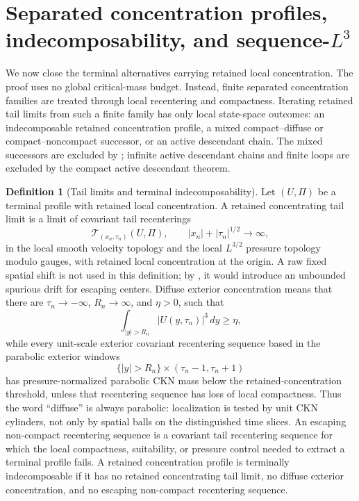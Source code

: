 \documentclass[11pt]{amsart}
\numberwithin{equation}{section}
\theoremstyle{plain}
\theoremstyle{definition}
\newtheorem{definition}[theorem]{Definition}
\theoremstyle{remark}
\begin{document}
\section{Separated concentration profiles, indecomposability, and sequence-\texorpdfstring{\(L^3\)}{L3}}
\label{sec:separated-profiles-atomic}

We now close the terminal alternatives carrying retained local concentration.
The proof uses no global critical-mass budget.  Instead, finite separated
concentration families are treated
through local recentering and compactness.  Iterating retained tail limits from
such a finite family has only local state-space outcomes: an indecomposable
retained concentration profile, a mixed compact--diffuse or compact--noncompact
successor, or an active descendant chain.  The mixed successors are excluded
by ; infinite active descendant chains and finite
loops are excluded by the compact active descendant theorem.

\begin{definition}[Tail limits and terminal indecomposability]
\label{def:atomic-terminal-profile}
Let \((U,\Pi)\) be a terminal profile with retained local concentration.  A
retained concentrating tail limit is a limit of covariant tail recenterings
\[
   \mathscr T_{(x_n,\tau_n)}(U,\Pi),
   \qquad |x_n|+|\tau_n|^{1/2}\to\infty,
\]
   in the local smooth velocity topology and the local \(L^{3/2}\) pressure
   topology modulo gauges, with retained local concentration at the origin.  A raw
   fixed spatial shift is not used in this definition; by
   , it would introduce an
   unbounded spurious drift for escaping centers.  Diffuse exterior concentration
   means that there are \(\tau_n\to-\infty\), \(R_n\to\infty\), and \(\eta>0\),
   such that
  \[
     \int_{|y|>R_n}|U(y,\tau_n)|^3\,dy\ge\eta,
  \]
   while every unit-scale exterior covariant recentering sequence based in the
   parabolic exterior windows
   \[
      \{|y|>R_n\}\times(\tau_n-1,\tau_n+1)
   \]
   has pressure-normalized parabolic CKN mass below the retained-concentration
   threshold, unless that recentering sequence has loss of local compactness.
   Thus the word ``diffuse'' is always parabolic: localization is tested by
   unit CKN cylinders, not only by spatial balls on the distinguished time
   slices.  An escaping non-compact recentering sequence is a
   covariant tail recentering sequence for which the local compactness,
suitability, or pressure control needed to extract a terminal profile fails.  A
retained concentration profile is terminally indecomposable if it has no
retained concentrating tail limit, no diffuse exterior concentration, and no
escaping non-compact recentering sequence.
\end{definition}
\end{document}
